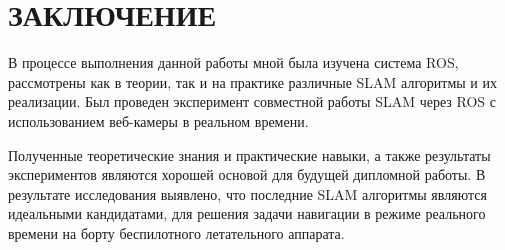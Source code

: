 \chapter*{ЗАКЛЮЧЕНИЕ}

В процессе выполнения данной работы мной была изучена система ROS, рассмотрены как в теории, так и на практике различные SLAM алгоритмы и их реализации. Был проведен эксперимент совместной работы SLAM через ROS с использованием веб-камеры в реальном времени.

Полученные теоретические знания и практические навыки, а также результаты экспериментов являются хорошей основой для будущей дипломной работы. В результате исследования выявлено, что последние SLAM алгоритмы являются идеальными кандидатами, для решения задачи навигации в режиме реального времени на борту беспилотного летательного аппарата.
\newpage
